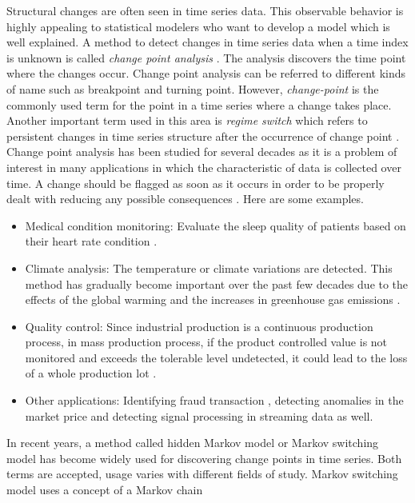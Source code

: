 Structural changes are often seen in time series data. This observable
behavior is highly appealing to statistical modelers who want to develop
a model which is well explained. A method to detect changes in time
series data when a time index is unknown is called \emph{change point
analysis} \citep{basseville1993detection}. The analysis discovers
the time point where the changes occur. Change point analysis can
be referred to different kinds of name such as breakpoint and turning
point. However, \emph{change-point} is the commonly used term for
the point in a time series where a change takes place. Another important
term used in this area is \emph{regime switch} which refers to persistent
changes in time series structure after the occurrence of change point
\citep{weskamp2010change}. Change point analysis has been studied
for several decades as it is a problem of interest in many applications
in which the characteristic of data is collected over time. A change
should be flagged as soon as it occurs in order to be properly dealt
with reducing any possible consequences \citep{sharkey2014nonparametric}.
Here are some examples.
\begin{itemize}
\item Medical condition monitoring: Evaluate the sleep quality of patients
based on their heart rate condition \citep{staudacher2005new}. 
\item Climate analysis: The temperature or climate variations are detected.
This method has gradually become important over the past few decades
due to the effects of the global warming and the increases in greenhouse
gas emissions \citep{reeves2007review,beaulieu2012change}. 
\item Quality control: Since industrial production is a continuous production
process, in mass production process, if the product controlled value
is not monitored and exceeds the tolerable level undetected, it could
lead to the loss of a whole production lot \citep{page1954continuous}. 
\item Other applications: Identifying fraud transaction \citep{bolton2002statistical},
detecting anomalies in the market price \citep{gu2013fast} and detecting
signal processing \citep{basseville1993detection} in streaming data
as well. 
\end{itemize}
In recent years, a method called hidden Markov model or Markov switching
model has become widely used for discovering change points in time
series. Both terms are accepted, usage varies with different fields
of study. Markov switching model uses a concept of a Markov chain
